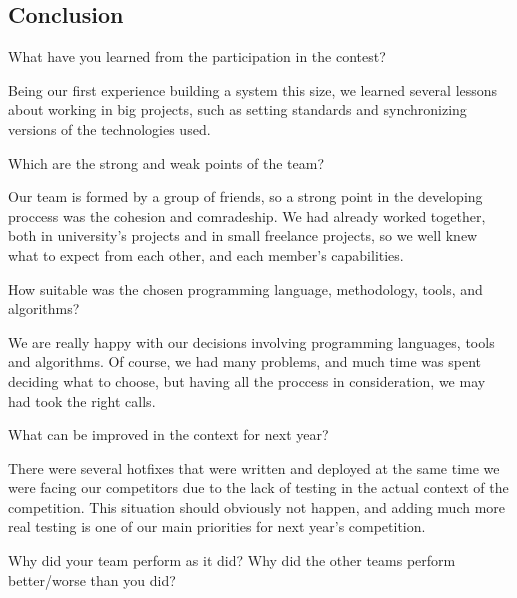 \subsection{Conclusion}

\begin{question}
What have you learned from the participation in the contest?
\end{question}

Being our first experience building a system this size, we learned several 
lessons about working in big projects, such as setting standards and 
synchronizing versions of the technologies used.

\begin{question}
Which are the strong and weak points of the team?
\end{question}

    Our team is formed by a group of friends, so a strong point in the
    developing proccess was the cohesion and comradeship. We had
    already worked together, both in university's projects and in
    small freelance projects, so we well knew what to expect from each other,
    and each member's capabilities.

\begin{question}  
How suitable was the chosen programming language, methodology, tools, and
algorithms?
\end{question}

    We are really happy with our decisions involving programming languages,
    tools and algorithms. Of course, we had many problems, and much time was
    spent deciding what to choose, but having all the proccess in
    consideration, we may had took the right calls.

\begin{question}
What can be improved in the context for next year?
\end{question}

There were several hotfixes that were written and deployed at the same 
time we were facing our competitors due to the lack of testing in the 
actual context of the competition. This situation should obviously not 
happen, and adding much more real testing is one of our main priorities 
for next year's competition.

\begin{question}
Why did your team perform as it did? Why did the other teams perform
better/worse than you did?
\end{question}

